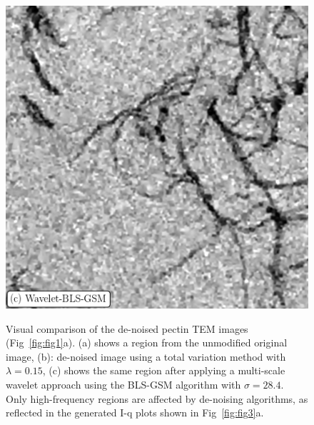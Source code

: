 \begin{figure}[!ht]
\begin{minipage}{0.32\textwidth}
  \end{minipage}
  \begin{minipage}{0.32\textwidth}
    \includegraphics[width=\linewidth]{Figures/chapter-temsaxs/pectinPortillaSigma28_crop_tile01_500x500_900_1900_label.png}\label{fig:denoise_comparison_pectin_wavelet}
  \end{minipage}
  \caption{Visual comparison of the de-noised pectin TEM images (Fig~\ref{fig:fig1}a). (a) shows a region from the unmodified original image, (b): de-noised image using a total variation method \cite{barbero_modular_2014} with $\lambda = 0.15$, (c) shows the same region after applying a multi-scale wavelet approach using the BLS-GSM algorithm \cite{portilla_image_2003} with $\sigma = 28.4$. Only high-frequency regions are affected by de-noising algorithms, as reflected in the generated I-q plots shown in Fig~\ref{fig:fig3}a.
}\label{fig:denoised_images}
\end{figure}


